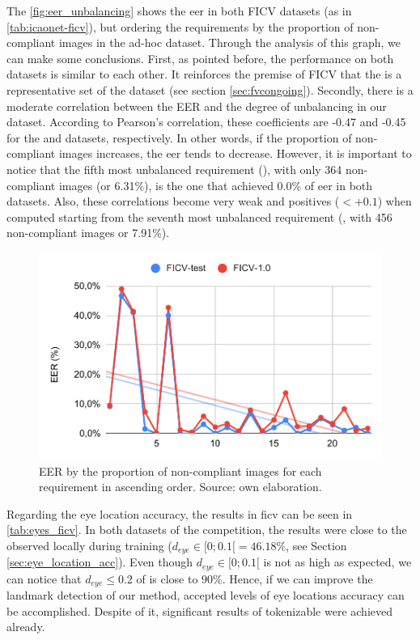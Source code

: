 The \autoref{fig:eer_unbalancing} shows the \acs{eer} in both FICV datasets (as in \autoref{tab:icaonet-ficv}), but ordering the requirements by the proportion of non-compliant images in the ad-hoc dataset. Through the analysis of this graph, we can make some conclusions. First, as pointed before, the performance on both datasets is similar to each other. It reinforces the premise of FICV that the \ficvtest is a representative set of the \ficvofficial dataset (see section \ref{sec:fvcongoing}). Secondly, there is a moderate correlation between the EER and the degree of unbalancing in our dataset. According to Pearson's correlation, these coefficients are -0.47 and -0.45 for the \ficvtest and \ficvofficial datasets, respectively. In other words, if the proportion of non-compliant images increases, the \acs{eer} tends to decrease. However, it is important to notice that the fifth most unbalanced requirement (\veiloverface), with only 364 non-compliant images (or 6.31\%), is the one that achieved 0.0\% of \acs{eer} in both datasets. Also, these correlations become very weak and positives ($< +0.1$) when computed starting from the seventh most unbalanced requirement (\toodarklight, with 456 non-compliant images or 7.91\%).

\begin{figure}[ht]
\centering
\includegraphics[width=0.8\linewidth]{images/graphs/eer_unbalancing.pdf}
\caption{EER by the proportion of non-compliant images for each requirement in ascending order. Source: own elaboration.}
\label{fig:eer_unbalancing}
\end{figure}



Regarding the eye location accuracy, the results in \acs{ficv} can be seen in \autoref{tab:eyes_ficv}. In both datasets of the competition, the results were close to the observed locally during training ($d_{eye} \in [0;0.1[ = 46.18\%$, see Section \ref{sec:eye_location_acc}). Even though $d_{eye} \in [0;0.1[$ is not as high as expected, we can notice that $d_{eye} \leq 0.2$ of \methodname is close to $90\%$. Hence, if we can improve the landmark detection of our method, accepted levels of eye locations accuracy can be accomplished. Despite of it, significant results of tokenizable were achieved already.

